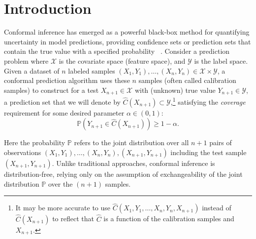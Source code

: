 \section{Introduction}

Conformal inference has emerged as a powerful black-box method for quantifying uncertainty in model predictions, providing confidence sets or prediction sets that contain the true value with a specified probability%
~\citep{gammerman1998learning,Vovkbook}. Consider a prediction problem where $\mathcal{X}$ is the covariate space (feature space), and $\mathcal{Y}$ is the label space.  Given a dataset of $n$ labeled samples $(X_1, Y_1), \dots, (X_n, Y_n) \in \mathcal{X} \times \mathcal{Y}$, a conformal prediction algorithm uses these $n$ samples (often called calibration samples) to construct for a test $X_{n+1} \in \mathcal{X}$ with (unknown) true value $Y_{n+1} \in \mathcal{Y}$, a prediction set that we will denote by $\widehat{C}(X_{n+1}) \subset \mathcal{Y}$,\footnote{It may be more accurate to use $\widehat{C}(X_1, Y_1, \dots, X_n,Y_n, X_{n+1})$ instead of $\widehat{C}(X_{n+1})$ to reflect that $\widehat{C}$ is a function of the calibration samples and $X_{n+1}$.} 
satisfying the {\em coverage} requirement for some desired parameter $\alpha \in (0,1)$:
\begin{equation}\label{eq:intro:coverage}
 \mathbb{P}\left(Y_{n+1} \in \widehat{C}(X_{n+1})\right)\geq 1-\alpha.
\end{equation}

 Here the probability $\mathbb{P}$ refers to the joint distribution over all $n+1$ pairs of observations $(X_1, Y_1), \dots, (X_n, Y_n), (X_{n+1}, Y_{n+1})$ including the test sample $(X_{n+1}, Y_{n+1})$. 
 Unlike traditional approaches, conformal inference is distribution-free, relying only on the assumption of exchangeability of the joint distribution $\mathbb{P}$  over the $(n+1)$ samples. %

